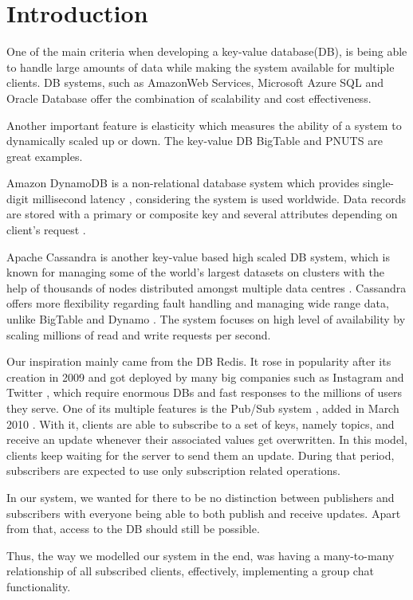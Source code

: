 \section{Introduction}
\label{sec:introduction}

One of the main criteria when developing a key-value database(DB), is being able to handle large amounts of data while making the system available for multiple clients. DB systems, such as AmazonWeb Services, Microsoft Azure SQL and Oracle Database offer the combination of scalability and cost effectiveness.

Another important feature is elasticity which measures the ability of a system to dynamically scaled up or down. The key-value DB BigTable and PNUTS are great examples\cite{agrawal2011database}.

Amazon DynamoDB is a non-relational database system which provides single-digit millisecond latency \cite{amazon}, considering the system is used worldwide. Data records are stored with a primary or composite key and several attributes depending on client's request \cite{kalid2017big}. 

Apache Cassandra is another key-value based high scaled \cite{abadi2012consistency} DB system, which is known for managing some of the world's largest datasets on clusters with the help of thousands of nodes distributed amongst multiple data centres \cite{chebotko2015big}. Cassandra offers more flexibility regarding fault handling and managing wide range data, unlike BigTable and Dynamo \cite{kalid2017big}. The system focuses on high level of availability by scaling millions of read and write requests per second\cite{chebotko2015big}.

Our inspiration mainly came from the DB Redis. It rose in popularity after its creation in 2009 and got deployed by many big companies such as Instagram \cite{krieger2011instagram} and Twitter \cite{yu2014twitter}, which require enormous DBs and fast responses to the millions of users they serve. One of its multiple features is the Pub/Sub system \cite{redis2020pubsub}, added in March 2010 \cite{sanfilippo2010pubsub}. With it, clients are able to subscribe to a set of keys, namely topics, and receive an update whenever their associated values get overwritten. In this model, clients keep waiting for the server to send them an update. During that period, subscribers are expected to use only subscription related operations.

In our system, we wanted for there to be no distinction between publishers and subscribers with everyone being able to both publish and receive updates. Apart from that, access to the DB should still be possible. 

Thus, the way we modelled our system in the end, was having a many-to-many relationship of all subscribed clients, effectively, implementing a group chat functionality.


